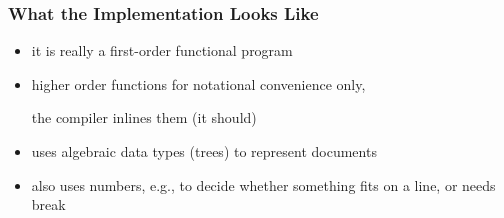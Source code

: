 
\begin{frame}[fragile]
\frametitle{What the Implementation Looks Like}

\begin{itemize}
\item it is really a first-order functional program
\item higher order functions for notational convenience only,

  the compiler inlines them (it should)
  
\item uses algebraic data types (trees) to represent
  documents
\item also uses numbers, e.g., to decide
  whether something fits on a line, or needs break
\end{itemize}

\end{frame}

